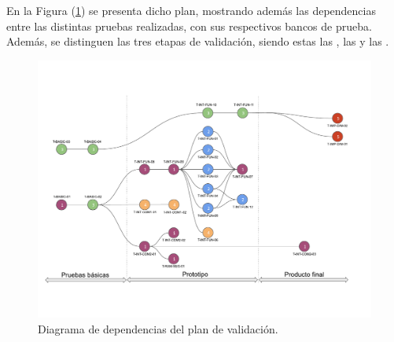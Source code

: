 En la Figura (\ref{fig:diagrama_plan_validacion}) se presenta dicho plan, mostrando además las dependencias entre las distintas pruebas realizadas, con sus respectivos bancos de prueba. Además, se distinguen las tres etapas de validación, siendo estas las , las  y las .
\begin{figure}[H]
	\centering
	\includegraphics[width=0.9\linewidth,page=1]{ImagenesPlan de validacion/Diagrama de Dependencias de Validacion}
	\caption{Diagrama de dependencias del plan de validación.}
	\label{fig:diagrama_plan_validacion}
\end{figure}

%